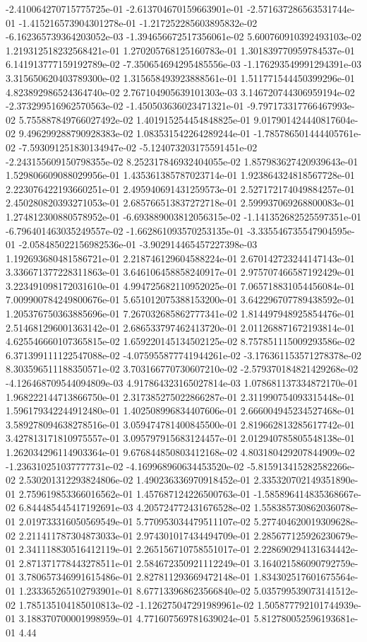 -2.410064270715775725e-01	-2.613704670159663901e-01	-2.571637286563531744e-01	-1.415216573904301278e-01	-1.217252285603895832e-02	-6.162365739364203052e-03	-1.394656672517356061e-02	5.600760910392493103e-02	1.219312518232568421e-01	1.270205768125160783e-01	1.301839770959784537e-01	6.141913777159192789e-02	-7.350654694295485556e-03	-1.176293549991294391e-03	3.315650620403789300e-02	1.315658493923888561e-01	1.511771544450399296e-01	4.823892986524364740e-02	2.767104905639101303e-03	3.146720744306959194e-02	-2.373299516962570563e-02	-1.450503636023471321e-01	-9.797173317766467993e-02	5.755887849766027492e-02	1.401915254454848825e-01	9.017901424440817604e-02	9.496299288790928383e-02	1.083531542264289244e-01	-1.785786501444405761e-02	-7.593091251830134947e-02	-5.124073203175591451e-02	-2.243155609150798355e-02	8.252317846932404055e-02	1.857983627420939643e-01	1.529806609088029956e-01	1.435361385787023714e-01	1.923864324818567728e-01	2.223076422193660251e-01	2.495940691431259573e-01	2.527172174049884257e-01	2.450280820393271053e-01	2.685766513837272718e-01	2.599937069268800083e-01	1.274812300880578952e-01	-6.693889003812056315e-02	-1.141352682525597351e-01	-6.796401463035249557e-02	-1.662861093570253135e-01	-3.335546735547904595e-01	-2.058485022156982536e-01	-3.902914465457227398e-03	1.192693680481586721e-01	2.218746129604588224e-01	2.670142723244147143e-01	3.336671377228311863e-01	3.646106458858240917e-01	2.975707466587192429e-01	3.223491098172031610e-01	4.994725682110952025e-01	7.065718831054456084e-01	7.009900784249800676e-01	5.651012075388153200e-01	3.642296707789438592e-01	1.205376750363885696e-01	7.267032685862777341e-02	1.814497948925854476e-01	2.514681296001363142e-01	2.686533797462413720e-01	2.011268871672193814e-01	4.625546660107365815e-02	1.659220145134502125e-02	8.757851115009293586e-02	6.371399111122547088e-02	-4.075955877741944261e-02	-3.176361153571278378e-02	8.303596511188350571e-02	3.703166770730607210e-02	-2.579370184821429268e-02	-4.126468709544094809e-03	4.917864323165027814e-03	1.078681137334872170e-01	1.968222144713866750e-01	2.317385275022866287e-01	2.311990754093315448e-01	1.596179342244912480e-01	1.402508996834407606e-01	2.666004945234527468e-01	3.589278094638278516e-01	3.059474781400845500e-01	2.819662813285617742e-01	3.427813171810975557e-01	3.095797915683124457e-01	2.012940785805548138e-01	1.262034296114903364e-01	9.676844850803412168e-02	4.803180429207844909e-02	-1.236310251037777731e-02	-4.169968960634453520e-02	-5.815913415282582266e-02	2.530201312293824806e-02	1.490236336970918452e-01	2.335320702149351890e-01	2.759619853366016562e-01	1.457687124226500763e-01	-1.585896414835368667e-02	6.844485445417192691e-03	4.205724772431676528e-02	1.558385730862036078e-01	2.019733316050569549e-01	5.770953034479511107e-02	5.277404620019309628e-02	2.211411787304873033e-01	2.974301017434494709e-01	2.285677125926230679e-01	2.341118830516412119e-01	2.265156710758551017e-01	2.228690294131634442e-01	2.871371778443278511e-01	2.584672350921112249e-01	3.164021586090792759e-01	3.780657346991615486e-01	2.827811293669472148e-01	1.834302517601675564e-01	1.233365265102793901e-01	8.677133968623566840e-02	5.035799539073141512e-02	1.785135104185010813e-02	-1.126275047291989961e-02	1.505877792101744939e-01	3.188370700001998959e-01	4.771607569781639024e-01	5.812780052596193681e-01	4.44